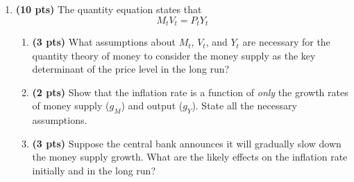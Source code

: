 \documentclass[addpoints,12pt,answers]{exam}
\begin{document}
\begin{enumerate}[label=\textbf{\arabic*.}, itemsep=15pt]
		\textbf{Solution}
		\begin{enumerate}[label=(\alph*)]
			\item \[ C_t + I_t + G_t = Y_t = \bar{a}_c \bar{Y}_t + \bar{x} \widetilde{Y}_t \bar{Y}+ \bar{a}_I \bar{Y}_t - \bar{b} \left(R_t - \bar{r}\right)\bar{Y}_t + \bar{a}_G \bar{Y}_t\]
				\[\frac{Y_t }{\bar{Y}_t}= \bar{a}_c  + \bar{x} \widetilde{Y}_t + \bar{a}_I  - \bar{b} \left(R_t - \bar{r}\right) + \bar{a}_G  \]
				\[\frac{Y_t }{\bar{Y}_t} - 1 = \tilde{Y}_t = \left[\bar{a}_c + \bar{a}_I + \bar{a}_G - 1\right] + \bar{x} \widetilde{Y}_t   - \bar{b} \left(R_t - \bar{r}\right)   \]
				\[\tilde{Y}_t -\bar{x} \widetilde{Y}_t   = \bar{a}  - \bar{b} \left(R_t - \bar{r}\right)   \]
				\[\widetilde{Y}_t   = \frac{1}{1-\bar{x}}\left[\bar{a}  - \bar{b} \left(R_t - \bar{r}\right)\right]   \]
			\item The multiplier is $\frac{1}{1-x}$. If the multiplier is equal to 2.5,
			\[2.5 = \frac{1}{1-\bar{x}} \]
			\[\bar{x} = 0.6\]
			\item The $\bar{x} = 0.2 $
			\item The government has to increase its expenditure by $8\%/2 = 4\%$
			\item \[-0.08 = 2.5 \left[0  - 0.5 \left(R_t - 0.05\right)\right] \]
			\[-0.08 = 2.5 \left[0  - 0.5 \left(R_t - 0.05\right)\right] \]
			\[R_t = 0.114\]
			
			*Since this part of the question didn't specific the multiplier, one may use any of the three number used above.
		\end{enumerate} 

	\item  \textbf{(10 pts)}\label{P5} The quantity equation states that
	\[M_t V_t = P_t Y_t\]
	
	
	\begin{enumerate}[label=(\alph*)]
			\item \textbf{(3 pts)} 	What assumptions about $M_t$, $V_t$, and $Y_t$ are necessary for the quantity theory of money to consider the money supply as the key determinant of the price level in the long run?

			\item \textbf{(2 pts)} Show that the inflation rate is a function of \textit{only} the growth rates of money supply ($g_M$) and output ($g_Y$). State all the necessary assumptions. 

			\item \textbf{(3 pts)} Suppose the central bank announces it will gradually slow down the money supply growth. What are the likely effects on the inflation rate initially and in the long run? 


\end{enumerate}
\end{enumerate}
\end{document}
